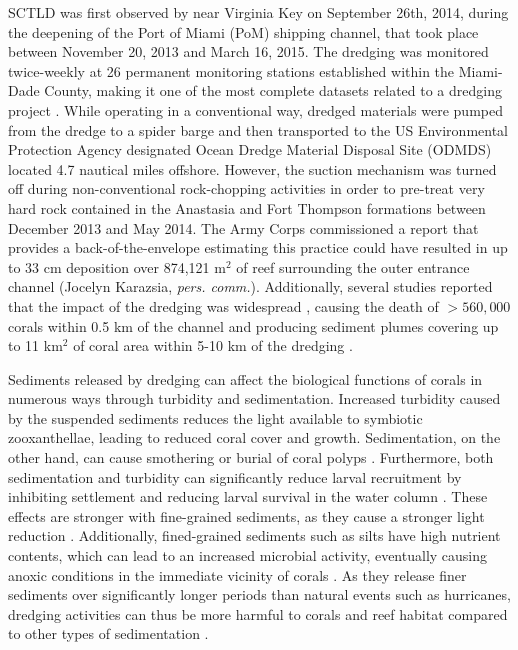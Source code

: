 \documentclass[preprint,12pt,authoryear]{elsarticle}
\begin{document}
SCTLD was first observed by \cite{precht2016unprecedented} near Virginia Key on September 26th, 2014, during the deepening of the Port of Miami (PoM) shipping channel, that took place between November 20, 2013 and March 16, 2015. The dredging was monitored twice-weekly at 26 permanent monitoring stations established within the Miami-Dade County, making it one of the most complete datasets related to a dredging project \citep{gintert2019regional}. While operating in a conventional way, dredged materials were pumped from the dredge to a spider barge and then transported to the US Environmental Protection Agency designated Ocean Dredge Material Disposal Site (ODMDS) located 4.7 nautical miles offshore. However, the suction mechanism was turned off during non-conventional rock-chopping activities in order to pre-treat very hard rock contained in the Anastasia and Fort Thompson formations between December 2013 and May 2014. The Army Corps commissioned a report that provides a back-of-the-envelope estimating this practice could have resulted in up to 33 cm deposition over 874,121 m$^2$ of reef surrounding the outer entrance channel (Jocelyn Karazsia, \textit{pers. comm.}). Additionally, several studies reported that the impact of the dredging was widespread \citep{miller2016detecting}, causing the death of  $> 560,000$ corals within 0.5 km of the channel \citep{cunning2019extensive} and producing sediment plumes covering up to 11 km$^2$ of coral area within 5-10 km of the dredging \citep{barnes2015sediment}.

Sediments released by dredging can affect the biological functions of corals in numerous ways \citep{erftemeijer2012environmental, jones2015effects} through turbidity and sedimentation. Increased turbidity caused by the suspended sediments reduces the light available to symbiotic zooxanthellae, leading to reduced coral cover and growth. Sedimentation, on the other hand, can cause smothering or burial of coral polyps \citep{erftemeijer2012environmental}. Furthermore, both sedimentation and turbidity can significantly reduce larval recruitment by inhibiting settlement and reducing larval survival in the water column \citep{jones2015effects}. These effects are stronger with fine-grained sediments, as they cause a stronger light reduction \citep{fourney2017additive}. Additionally, fined-grained sediments such as silts have high nutrient contents, which can lead to an increased microbial activity, eventually causing anoxic conditions in the immediate vicinity of corals \citep{weber2012mechanisms}. As they release finer sediments over significantly longer periods than natural events such as hurricanes, dredging activities can thus be more harmful to corals and reef habitat compared to other types of sedimentation \citep{cunning2019extensive}.
\end{document}
